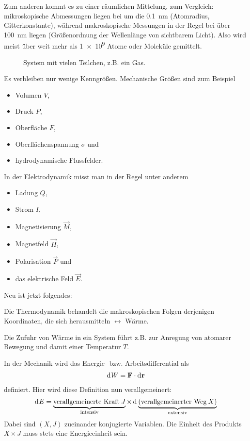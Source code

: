 Zum anderen kommt es zu einer räumlichen Mittelung, zum Vergleich: mikroskopische Abmessungen liegen bei um die \SI{0.1}{\nm} (Atomradius, Gitterkonstante), während makroskopische Messungen in der Regel bei über \SI{100}{\nm} liegen (Größenordnung der Wellenlänge von sichtbarem Licht).
Also wird meist über weit mehr als \num{1e9} Atome oder Moleküle gemittelt.

\begin{figure}[htbp]
    \centering
    \tfigSystemWithManyParticles
    \caption{System mit vielen Teilchen, z.B. ein Gas.}
    \label{fig:SystemWithManyParticles}
\end{figure}

Es verbleiben nur wenige Kenngrößen. Mechanische Größen sind zum Beispiel
\begin{itemize}
    \item Volumen $V$,
    \item Druck $P$,
    \item Oberfläche $F$,
    \item Oberflächenspannung $\sigma$ und
    \item hydrodynamische Flussfelder.
\end{itemize}

In der Elektrodynamik misst man in der Regel unter anderem
\begin{itemize}
    \item Ladung $Q$,
    \item Strom $I$,
    \item Magnetisierung $\vec M$,
    \item Magnetfeld $\vec H$,
    \item Polarisation $\vec P$ und
    \item das elektrische Feld $\vec E$.
\end{itemize}

Neu ist jetzt folgendes:
\begin{formal}
    Die Thermodynamik behandelt die makroskopischen Folgen derjenigen Koordinaten, die sich herausmitteln $\leftrightarrow$ Wärme.
\end{formal}

Die Zufuhr von Wärme in ein System führt z.B. zur Anregung von atomarer Bewegung und damit einer Temperatur $T$.

In der Mechanik wird das Energie- bzw. Arbeitsdifferential als
\begin{align*}
    \mathop{\mathrm{d}^{}W} = \mathbf{F}\cdot\mathop{\mathrm{d}^{}\mathbf{r}}
\end{align*}
definiert. Hier wird diese Definition nun verallgemeinert:
\begin{align*}
    \mathop{\mathrm{d}^{}E} = \underbrace{\text{verallgemeinerte Kraft}\: J}_{\text{intensiv}} \times \mathop{\mathrm{d}^{}\underbrace{(\text{verallgemeinerter Weg}\: X)}_{\text{extensiv}}}
\end{align*}
Dabei sind $(X,J)$ zueinander konjugierte Variablen. Die Einheit des Produkts $X\times J$ muss stets eine Energieeinheit sein.

